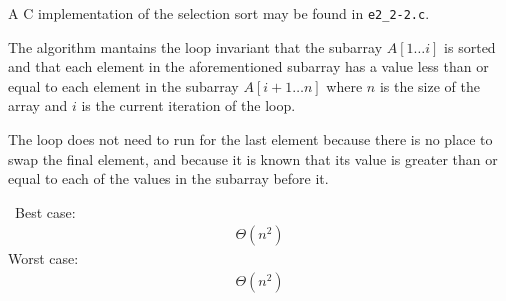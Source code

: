 A C implementation of the selection sort may be found in \texttt{e2\_2-2.c}.

The algorithm mantains the loop invariant that the subarray $A[1 \ldots i]$ is sorted and that each element in the aforementioned subarray has a value less than or equal to each element in the subarray $A[i+1 \ldots n]$ where $n$ is the size of the array and $i$ is the current iteration of the loop.

The loop does not need to run for the last element because there is no place to swap the final element, and because it is known that its value is greater than or equal to each of the values in the subarray before it.

\noindent~Best case:
\begin{eqnarray*}
	\Theta(n^2)
\end{eqnarray*}
Worst case:
\begin{eqnarray*}
	\Theta(n^2)
\end{eqnarray*}
